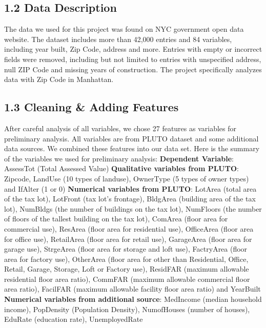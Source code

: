 \documentclass[9pt,twocolumn,twoside]{pnas-new}
\begin{document}
\subsection*{1.2 Data Description}

The data we used for this project was found on NYC government open data website. The dataset includes more than 42,000 entries and 84 variables, including year built, Zip Code, address and more. Entries with empty or incorrect fields were removed, including but not limited to entries with unspecified address, null ZIP Code and missing years of construction. The project specifically analyzes data with Zip Code in Manhattan. 

\subsection*{1.3 Cleaning \& Adding Features}

After careful analysis of all variables, we chose 27 features as variables for preliminary analysis. All variables are from PLUTO dataset and some additional data sources. We combined these features into our data set. Here is the summary of the variables we used for preliminary analysis: \newline
\linebreak
\textbf{Dependent Variable}: AssessTot (Total Assessed Value)
\newline
\linebreak
\textbf{Qualitative variables from PLUTO}: Zipcode, LandUse (10 types of landuse), OwnerType (5 types of owner types) and IfAlter (1 or 0)\newline
\linebreak
\textbf{Numerical variables from PLUTO}: LotArea (total area of the tax lot), LotFront (tax lot's frontage), BldgArea (building area of the tax lot), NumBldgs (the number of buildings on the tax lot), NumFloors (the number of floors of the tallest building on the tax lot), ComArea (floor area for commercial use), ResArea (floor area for residential use), OfficeArea (floor area for office use), RetailArea (floor area for retail use), GarageArea (floor area for garage use), StrgeArea (floor area for storage and loft use), FactryArea (floor area for factory use), OtherArea (floor area for other than Residential, Office, Retail, Garage, Storage, Loft or Factory use), ResidFAR (maximum allowable residential floor area ratio), CommFAR (maximum allowable commercial floor area ratio), FacilFAR (maximum allowable facility floor area ratio) and YearBuilt \newline
\linebreak
\textbf{Numerical variables from additional source}: MedIncome (median household income), PopDensity (Population Density), NumofHouses (number of houses), EduRate (education rate), UnemployedRate  
\end{document}
